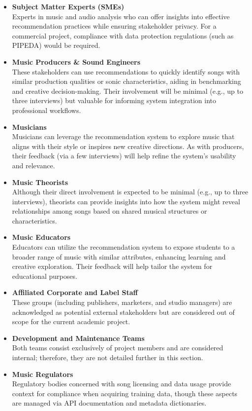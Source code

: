 \documentclass[12pt]{article}
\begin{document}
\begin{itemize}
  \item \textbf{Subject Matter Experts (SMEs)}\\
    Experts in music and audio analysis who can offer insights into effective recommendation practices while ensuring stakeholder privacy. For a commercial project, compliance with data protection regulations (such as PIPEDA) would be required.
    
  \item \textbf{Music Producers \& Sound Engineers}\\
    These stakeholders can use recommendations to quickly identify songs with similar production qualities or sonic characteristics, aiding in benchmarking and creative decision-making. Their involvement will be minimal (e.g., up to three interviews) but valuable for informing system integration into professional workflows.
    
  \item \textbf{Musicians}\\
    Musicians can leverage the recommendation system to explore music that aligns with their style or inspires new creative directions. As with producers, their feedback (via a few interviews) will help refine the system’s usability and relevance.
    
  \item \textbf{Music Theorists}\\
    Although their direct involvement is expected to be minimal (e.g., up to three interviews), theorists can provide insights into how the system might reveal relationships among songs based on shared musical structures or characteristics.
    
  \item \textbf{Music Educators}\\
    Educators can utilize the recommendation system to expose students to a broader range of music with similar attributes, enhancing learning and creative exploration. Their feedback will help tailor the system for educational purposes.
    
  \item \textbf{Affiliated Corporate and Label Staff}\\
    These groups (including publishers, marketers, and studio managers) are acknowledged as potential external stakeholders but are considered out of scope for the current academic project.
    
  \item \textbf{Development and Maintenance Teams}\\
    Both teams consist exclusively of project members and are considered internal; therefore, they are not detailed further in this section.
    
  \item \textbf{Music Regulators}\\
    Regulatory bodies concerned with song licensing and data usage provide context for compliance when acquiring training data, though these aspects are managed via API documentation and metadata dictionaries.
\end{itemize}
\end{document}
